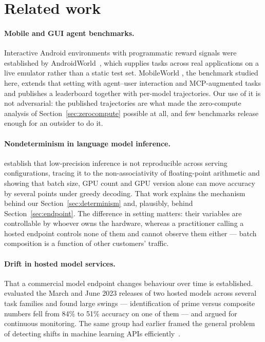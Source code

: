 \section{Related work}

\paragraph{Mobile and GUI agent benchmarks.} Interactive Android environments
with programmatic reward signals were established by
AndroidWorld~\citep{rawles2025androidworld}, which supplies tasks across real
applications on a live emulator rather than a static test set. MobileWorld
\citep{kong2026mobileworld}, the benchmark studied here, extends that setting
with agent--user interaction and MCP-augmented tasks and publishes a leaderboard
together with per-model trajectories. Our use of it is not adversarial: the
published trajectories are what made the zero-compute analysis of
Section~\ref{sec:zerocompute} possible at all, and few benchmarks release
enough for an outsider to do it.

\paragraph{Nondeterminism in language model inference.}
\citet{yuan2025nondeterminism} establish that low-precision inference is not
reproducible across serving configurations, tracing it to the non-associativity
of floating-point arithmetic and showing that batch size, GPU count and GPU
version alone can move accuracy by several points under greedy decoding. That
work explains the mechanism behind our Section~\ref{sec:determinism} and,
plausibly, behind Section~\ref{sec:endpoint}. The difference in setting matters:
their variables are controllable by whoever owns the hardware, whereas a
practitioner calling a hosted endpoint controls none of them and cannot observe
them either --- batch composition is a function of other customers' traffic.

\paragraph{Drift in hosted model services.} That a commercial model endpoint
changes behaviour over time is established. \citet{chen2024chatgpt} evaluated
the March and June 2023 releases of two hosted models across several task
families and found large swings --- identification of prime versus composite
numbers fell from 84\% to 51\% accuracy on one of them --- and argued for
continuous monitoring. The same group had earlier framed the general problem of
detecting shifts in machine learning APIs efficiently~\citep{chen2021apishifts}.

